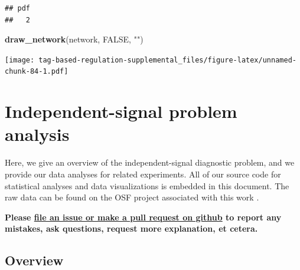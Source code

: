 \documentclass[]{book}
\newenvironment{Shaded}{\begin{snugshade}}{\end{snugshade}}
\newcommand{\KeywordTok}[1]{\textcolor[rgb]{0.13,0.29,0.53}{\textbf{#1}}}
\newcommand{\NormalTok}[1]{#1}
\newcommand{\OtherTok}[1]{\textcolor[rgb]{0.56,0.35,0.01}{#1}}
\newcommand{\StringTok}[1]{\textcolor[rgb]{0.31,0.60,0.02}{#1}}
\begin{document}
\begin{verbatim}
## pdf 
##   2
\end{verbatim}

\begin{Shaded}
\begin{Highlighting}[]
\KeywordTok{draw_network}\NormalTok{(network, }\OtherTok{FALSE}\NormalTok{, }\StringTok{""}\NormalTok{)}
\end{Highlighting}
\end{Shaded}

\texttt{[image: tag-based-regulation-supplemental\_files/figure-latex/unnamed-chunk-84-1.pdf]}

\hypertarget{independent-signal-problem-analysis}{%
\chapter{Independent-signal problem analysis}\label{independent-signal-problem-analysis}}

Here, we give an overview of the independent-signal diagnostic problem, and we provide our data analyses for related experiments.
All of our source code for statistical analyses and data visualizations is embedded in this document.
The raw data can be found on the OSF project associated with this work \citep{Lalejini_Moreno_Ofria_Data_2020}.

\textbf{Please \href{https://github.com/amlalejini/Tag-based-Genetic-Regulation-for-LinearGP/issues}{file an issue or make a pull request on github} to report any mistakes, ask questions, request more explanation, et cetera.}

\hypertarget{overview-3}{%
\section{Overview}\label{overview-3}}
\end{document}
